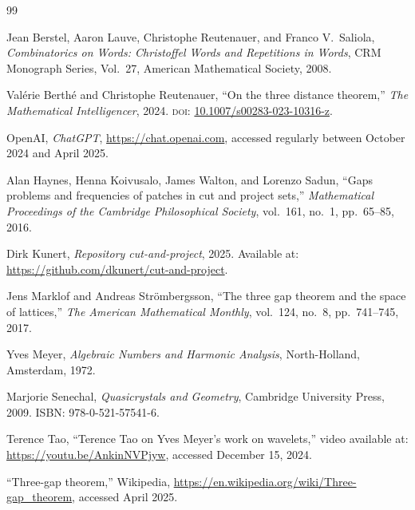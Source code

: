 \documentclass[11pt]{article}
\theoremstyle{plain}
\theoremstyle{definition}
\theoremstyle{remark}
\begin{document}
\begin{thebibliography}{99}

Jean Berstel, Aaron Lauve, Christophe Reutenauer, and Franco V.\ Saliola,
\emph{Combinatorics on Words: Christoffel Words and Repetitions in Words},
CRM Monograph Series, Vol.~27,
American Mathematical Society, 2008.

Val\'{e}rie Berth\'{e} and Christophe Reutenauer,
``On the three distance theorem,''
\emph{The Mathematical Intelligencer}, 2024.
\textsc{doi}: \href{https://doi.org/10.1007/s00283-023-10316-z}%
{10.1007/s00283-023-10316-z}.

OpenAI,
\emph{ChatGPT},
\url{https://chat.openai.com}, accessed regularly between October 2024 and
April 2025.

Alan Haynes, Henna Koivusalo, James Walton, and Lorenzo Sadun,
``Gaps problems and frequencies of patches in cut and project sets,''
\emph{Mathematical Proceedings of the Cambridge Philosophical Society},
vol.~161, no.~1, pp.~65--85, 2016.

Dirk Kunert,
\emph{Repository cut-and-project}, 2025.
Available at: \url{https://github.com/dkunert/cut-and-project}.

Jens Marklof and Andreas Str\"{o}mbergsson,
``The three gap theorem and the space of lattices,''
\emph{The American Mathematical Monthly}, vol.~124, no.~8, pp.~741--745,
2017.

Yves Meyer,
\emph{Algebraic Numbers and Harmonic Analysis},
North-Holland, Amsterdam, 1972.

Marjorie Senechal,
\emph{Quasicrystals and Geometry},
Cambridge University Press, 2009.
ISBN: 978-0-521-57541-6.

Terence Tao,
``Terence Tao on Yves Meyer's work on wavelets,''
video available at: \url{https://youtu.be/AnkinNVPjyw}, accessed
December 15, 2024.

``Three-gap theorem,''
Wikipedia,
\url{https://en.wikipedia.org/wiki/Three-gap_theorem}, accessed April 2025.

\end{thebibliography}
\end{document}
